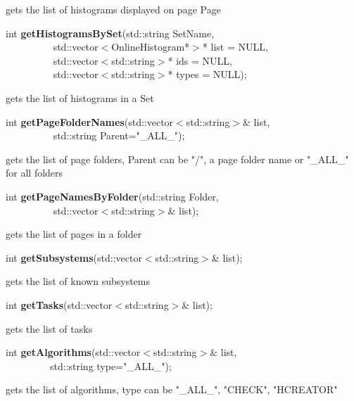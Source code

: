  gets the list of histograms displayed on page Page


\item    int {\bf getHistogramsBySet}(std::string SetName,\\\mbox{}~~~~~~~~~
			 std::vector$<$OnlineHistogram*$>$* list = NULL,\\\mbox{}~~~~~~~~~
			 std::vector$<$std::string$>$* ids = NULL,\\\mbox{}~~~~~~~~~
			 std::vector$<$std::string$>$* types = NULL);

 gets the list of histograms in a Set


\item    int {\bf getPageFolderNames}(std::vector$<$std::string$>$\& list,\\\mbox{}~~~~~~~~~ std::string Parent="\_ALL\_");


 gets the list of page folders, Parent can be "/", a page folder name or "\_ALL\_" for all folders  


\item    int {\bf getPageNamesByFolder}(std::string Folder,\\\mbox{}~~~~~~~~~
			   std::vector$<$std::string$>$\& list);

 gets the list of pages in a folder


\item    int {\bf getSubsystems}(std::vector$<$std::string$>$\& list);


 gets the list of known subsystems


\item    int {\bf getTasks}(std::vector$<$std::string$>$\& list);


 gets the list of tasks


\item    int {\bf getAlgorithms}(std::vector$<$std::string$>$\& list,\\\mbox{}~~~~~~~~~std::string type="\_ALL\_");


 gets the list of algorithms, type can be "\_ALL\_", "CHECK", "HCREATOR"


